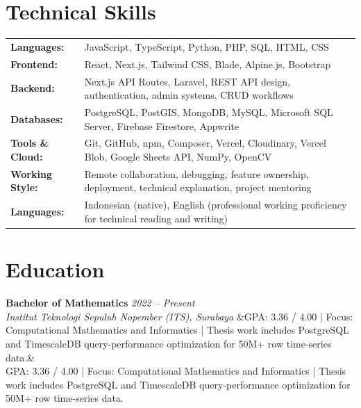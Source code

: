 \documentclass[a4paper,11pt]{article}
\newcommand{\cventry}[4]{%
  \noindent\textbf{#1} \hfill \textit{#3} \\
  \textit{#2}
  \ifx&#4& \else \\ \small #4 \fi
  \vspace{6pt}
}
\begin{document}
\section{Technical Skills}
\begin{tabularx}{\textwidth}{@{}l X@{}}
\textbf{Languages:} & JavaScript, TypeScript, Python, PHP, SQL, HTML, CSS \\[3pt]
\textbf{Frontend:} & React, Next.js, Tailwind CSS, Blade, Alpine.js, Bootstrap \\[3pt]
\textbf{Backend:} & Next.js API Routes, Laravel, REST API design, authentication, admin systems, CRUD workflows \\[3pt]
\textbf{Databases:} & PostgreSQL, PostGIS, MongoDB, MySQL, Microsoft SQL Server, Firebase Firestore, Appwrite \\[3pt]
\textbf{Tools \& Cloud:} & Git, GitHub, npm, Composer, Vercel, Cloudinary, Vercel Blob, Google Sheets API, NumPy, OpenCV \\[3pt]
\textbf{Working Style:} & Remote collaboration, debugging, feature ownership, deployment, technical explanation, project mentoring \\[3pt]
\textbf{Languages:} & Indonesian (native), English (professional working proficiency for technical reading and writing) \\
\end{tabularx}

\section{Education}
\cventry
  {Bachelor of Mathematics}
  {Institut Teknologi Sepuluh Nopember (ITS), Surabaya}
  {2022 -- Present}
  {GPA: 3.36 / 4.00 | Focus: Computational Mathematics and Informatics | Thesis work includes PostgreSQL and TimescaleDB query-performance optimization for 50M+ row time-series data.}
\end{document}
